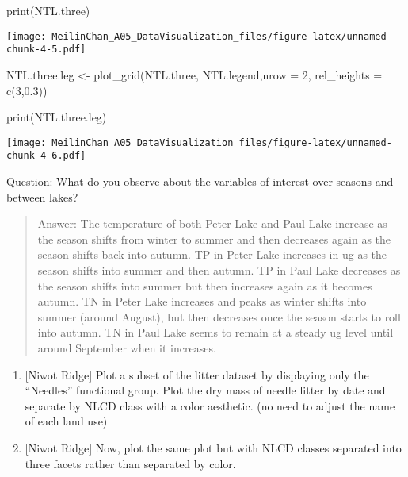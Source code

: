 \documentclass[
]{article}
\newenvironment{Shaded}{\begin{snugshade}}{\end{snugshade}}
\newcommand{\AttributeTok}[1]{\textcolor[rgb]{0.77,0.63,0.00}{#1}}
\newcommand{\DecValTok}[1]{\textcolor[rgb]{0.00,0.00,0.81}{#1}}
\newcommand{\FloatTok}[1]{\textcolor[rgb]{0.00,0.00,0.81}{#1}}
\newcommand{\FunctionTok}[1]{\textcolor[rgb]{0.00,0.00,0.00}{#1}}
\newcommand{\NormalTok}[1]{#1}
\newcommand{\OtherTok}[1]{\textcolor[rgb]{0.56,0.35,0.01}{#1}}
\begin{document}
\begin{Shaded}
\begin{Highlighting}[]
\FunctionTok{print}\NormalTok{(NTL.three) }
\end{Highlighting}
\end{Shaded}

\texttt{[image: MeilinChan\_A05\_DataVisualization\_files/figure-latex/unnamed-chunk-4-5.pdf]}

\begin{Shaded}
\begin{Highlighting}[]
\NormalTok{NTL.three.leg }\OtherTok{\textless{}{-}} \FunctionTok{plot\_grid}\NormalTok{(NTL.three, NTL.legend,}\AttributeTok{nrow =} \DecValTok{2}\NormalTok{, }
                           \AttributeTok{rel\_heights =} \FunctionTok{c}\NormalTok{(}\DecValTok{3}\NormalTok{,}\FloatTok{0.3}\NormalTok{))}

\FunctionTok{print}\NormalTok{(NTL.three.leg)}
\end{Highlighting}
\end{Shaded}

\texttt{[image: MeilinChan\_A05\_DataVisualization\_files/figure-latex/unnamed-chunk-4-6.pdf]}

Question: What do you observe about the variables of interest over
seasons and between lakes?

\begin{quote}
Answer: The temperature of both Peter Lake and Paul Lake increase as the
season shifts from winter to summer and then decreases again as the
season shifts back into autumn. TP in Peter Lake increases in ug as the
season shifts into summer and then autumn. TP in Paul Lake decreases as
the season shifts into summer but then increases again as it becomes
autumn. TN in Peter Lake increases and peaks as winter shifts into
summer (around August), but then decreases once the season starts to
roll into autumn. TN in Paul Lake seems to remain at a steady ug level
until around September when it increases.
\end{quote}

\begin{enumerate}
\def\labelenumi{\arabic{enumi}.}
\setcounter{enumi}{5}
\item
  {[}Niwot Ridge{]} Plot a subset of the litter dataset by displaying
  only the ``Needles'' functional group. Plot the dry mass of needle
  litter by date and separate by NLCD class with a color aesthetic. (no
  need to adjust the name of each land use)
\item
  {[}Niwot Ridge{]} Now, plot the same plot but with NLCD classes
  separated into three facets rather than separated by color.
\end{enumerate}
\end{document}
